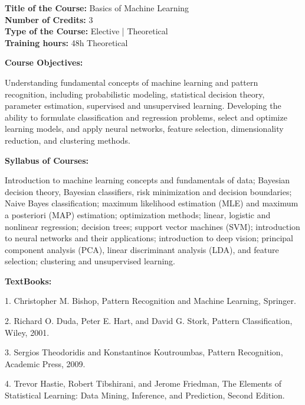 \documentclass[12pt,a4paper]{article}
\begin{document}
\newpage
\textbf{Title of the Course:} Basics of Machine Learning\\
\textbf{Number of Credits:} 3\\
\textbf{Type of the Course:} Elective | Theoretical\\
\textbf{Training hours:} 48h Theoretical\par\vspace{4pt}
\textbf{Course Objectives:}\par\vspace{2pt}
Understanding fundamental concepts of machine learning and pattern recognition, including probabilistic modeling, statistical decision theory, parameter estimation, supervised and unsupervised learning. Developing the ability to formulate classification and regression problems, select and optimize learning models, and apply neural networks, feature selection, dimensionality reduction, and clustering methods.\par\vspace{4pt}
\textbf{Syllabus of Courses:}\par\vspace{2pt}
Introduction to machine learning concepts and fundamentals of data; Bayesian decision theory, Bayesian classifiers, risk minimization and decision boundaries; Naive Bayes classification; maximum likelihood estimation (MLE) and maximum a posteriori (MAP) estimation; optimization methods; linear, logistic and nonlinear regression; decision trees; support vector machines (SVM); introduction to neural networks and their applications; introduction to deep vision; principal component analysis (PCA), linear discriminant analysis (LDA), and feature selection; clustering and unsupervised learning.\par\vspace{4pt}
\textbf{TextBooks:}\par\vspace{2pt}
1. Christopher M. Bishop, Pattern Recognition and Machine Learning, Springer.\par
2. Richard O. Duda, Peter E. Hart, and David G. Stork, Pattern Classification, Wiley, 2001.\par
3. Sergios Theodoridis and Konstantinos Koutroumbas, Pattern Recognition, Academic Press, 2009.\par
4. Trevor Hastie, Robert Tibshirani, and Jerome Friedman, The Elements of Statistical Learning: Data Mining, Inference, and Prediction, Second Edition.\par
\vspace{4pt}
\end{document}
